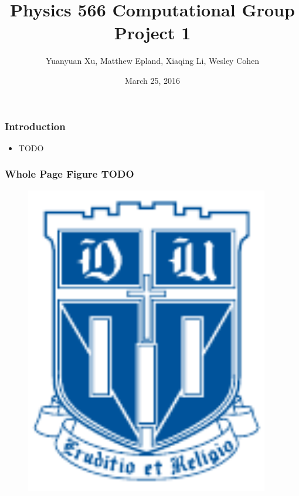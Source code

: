 \documentclass[mathserif,18pt,xcolor=table]{beamer}
\title[Group Project 1]{Physics 566 Computational Group Project 1} %
\author[Xu, Epland, Li, Cohen]{{\small Yuanyuan Xu, Matthew Epland, Xiaqing Li, Wesley Cohen}}
\institute{Duke University}
\date{March 25, 2016}
\begin{document}
\beamertemplateballitem
\frame{\titlepage}


\begin{frame}
  \frametitle{Introduction}
  \begin{itemize}
    \item TODO
  \end{itemize}

\end{frame}

\begin{frame}
  \frametitle{Whole Page Figure TODO}

\begin{figure}
  \centering
  \includegraphics[width=0.95\textwidth]{logos/duke_logo.pdf}
\end{figure}

\end{frame}
\end{document}
